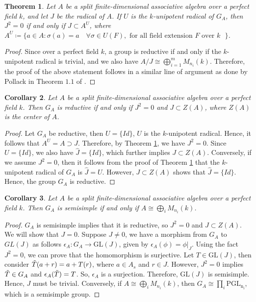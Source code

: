 \documentclass[12pt]{amsart}
\newtheorem{theorem}{Theorem}[section]
\newtheorem{corollary}[theorem]{Corollary}
\theoremstyle{definition}
\numberwithin{equation}{section}
\begin{document}
\vskip2mm
\begin{theorem}\label{Theorem 3.1}
Let $A$ be a split finite-dimensional associative algebra over a perfect field $k$, and let $J$ be the radical of $A$. If $U$ is the $k$-unipotent radical of $G_A$, then $J^2=0$ if and only if $J\subset A^{U}$, where $A^U\coloneq \{a\in A:\sigma(a)=a \quad \forall \sigma\in U(F), \text{ for all field extension $F$ over $k$ } \}$. 
\end{theorem}
\vskip1mm
\begin{proof}
Since over a perfect field $k$, a group is reductive if and only if the $k$-unipotent radical is trivial, and we also have $A/J\cong \bigoplus_{i=1}^{m}M_{n_{i}}(k)$. Therefore, the proof of the above statement follows in a similar line of argument as done by Pollack in Theorem $1.1$ of \cite{Pollack}.
\end{proof}
\vskip2mm

\vspace{2mm}
\begin{corollary}\label{Corollary 3.2}
Let $A$ be a split finite-dimensional associative algebra over a perfect field $k$. Then $G_A$ is reductive if and only if $J^2=0$ and $J\subset Z(A)$, where $Z(A)$ is the center of $A$.
\end{corollary}
\vskip1mm
\begin{proof}
    Let $G_A$ be reductive, then $U=\{Id\}$, $U$ is the $k$-unipotent radical. Hence, it follows that $A^U=A\supset J$. Therefore, by Theorem \ref{Theorem 3.1}, we have $J^2=0$. Since $U=\{Id\}$, we also have $\hat{J}=\{Id\}$, which further implies $J\subset Z(A)$. Conversely, if we assume $J^2=0$, then it follows from the proof of Theorem \ref{Theorem 3.1} that the $k$-unipotent radical of $G_A$ is $\hat{J}=U$. However, $J\subset Z(A)$ shows that $\hat{J}=\{Id\}$. Hence, the group $G_A$ is reductive.
\end{proof}

\vskip2mm
\begin{corollary}\label{Corollary 3.3}
Let $A$ be a split finite-dimensional associative algebra over a perfect field $k$. Then $G_A$ is semisimple if and only if $A\cong \bigoplus_i M_{n_i}(k)$. 
\end{corollary}
\vskip1mm
\begin{proof}
$G_A$ is semisimple implies that it is reductive, so $J^2=0$ and $J\subset Z(A)$. We will show that $J=0$. Suppose $J\neq 0$, we have a morphism from $G_A$ to $GL(J)$ as follows $\epsilon_A: G_A\rightarrow \text{GL}(J)$, given by $\epsilon_A(\phi)=\phi|_{J}$. Using the fact $J^2=0$, we can prove that the homomorphism is surjective. Let $T\in \text{GL}(J)$, then consider $\Tilde{T}(a+r)=a+T(r)$, where $a\in A_s$ and $r\in J$. However, $J^2=0$ implies $\Tilde{T}\in G_A$ and $\epsilon_A(\Tilde{T})=T$. So, $\epsilon_A$ is a surjection. Therefore, $\text{GL}(J)$ is semisimple. Hence, $J$ must be trivial. Conversely, if $A\cong \bigoplus_i M_{n_i}(k)$, then $G_{A}\cong \prod_i \mathrm{PGL_{n_i}}$, which is a semisimple group.
\end{proof}
\end{document}
